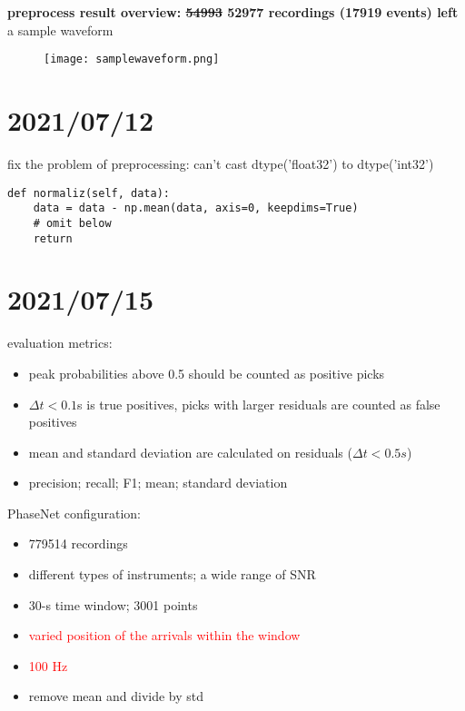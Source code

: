 \documentclass{article}
\begin{document}
\par{\textbf{preprocess result overview: \sout{54993} 52977 recordings (17919 events) left}}\\
a sample waveform
\begin{figure}[H]
  \centering
  \texttt{[image: samplewaveform.png]}
  \label{samplewaveform}
\end{figure}


\section{2021/07/12}
\par{fix the problem of preprocessing: can't cast dtype('float32') to dtype('int32')}
\begin{lstlisting}
def normaliz(self, data):
	data = data - np.mean(data, axis=0, keepdims=True)
	# omit below
	return
\end{lstlisting}


\section{2021/07/15}
\par{evaluation metrics:}
\begin{itemize}
  \item peak probabilities above 0.5 should be counted as positive picks
  \item $\Delta t<0.1$s is true positives, picks with larger residuals are counted as false positives
  \item mean and standard deviation are calculated on residuals ($\Delta t<0.5s$)
  \item precision; recall; F1; mean; standard deviation
\end{itemize}

\par{PhaseNet configuration:}
\begin{itemize}
  \item 779514 recordings
  \item different types of instruments; a wide range of SNR
  \item 30-s time window; 3001 points
  \item \textcolor{red}{varied position of the arrivals within the window}
  \item \textcolor{red}{100 Hz}
  \item remove mean and divide by std
\end{itemize}
\end{document}
